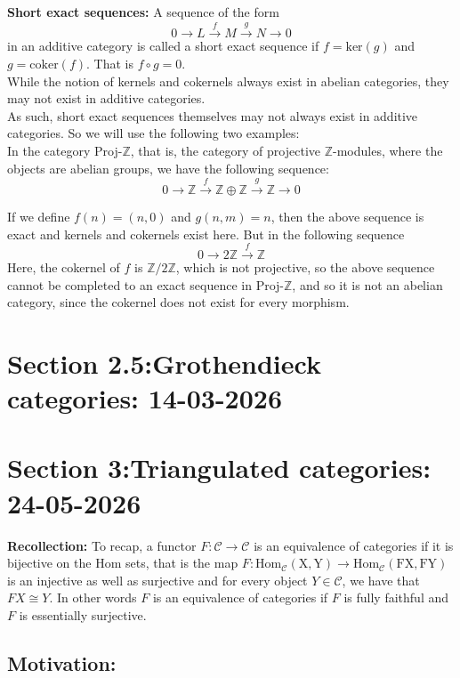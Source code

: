 \documentclass[12pt]{article}
\newcommand{\cat}[1]{\mathscr{#1}}
\begin{document}
\textbf{Short exact sequences: } A sequence of the form 
\[
 0 \xrightarrow{}L \xrightarrow{f}M \xrightarrow{g}N \xrightarrow{}0
\]
 in an additive category is called a short exact sequence if
 $f=\mathrm{ker}(g)$ and $g=\mathrm{coker}(f)$. That is $f \circ g=0$.\\

  While the notion of kernels and cokernels always exist in abelian categories, they may not exist in additive categories.\\
  As such, short exact sequences themselves may not always exist in additive categories. So we will use the following two examples:\\
  In the category Proj-$\mathbb{Z}$, that is, the category of projective $\mathbb{Z}$-modules, where the objects are abelian groups, we have the following sequence:
  \[
  0 \to \mathbb{Z} \xrightarrow{f} \mathbb{Z}\oplus \mathbb{Z} \xrightarrow{g}\mathbb{Z} \to 0
   \]

   If we define $f(n)=(n,0)$ and $g(n,m)=n$, then the above sequence is exact and kernels and cokernels exist here. But in the following sequence
   \[
   0 \to 2\mathbb{Z} \xrightarrow{f} \mathbb{Z} 
   \]
   Here, the cokernel of $f$ is $\mathbb{Z}/2\mathbb{Z}$, which is not projective, so the above sequence cannot be completed to an exact sequence in Proj-$\mathbb{Z}$, and so it is not an abelian category, since the cokernel does not exist for every morphism. 
\section*{Section 2.5:Grothendieck categories: 14-03-2026}
\section*{Section 3:Triangulated categories: 24-05-2026}
\textbf{Recollection: } To recap, a functor $F: \cat{C \to \cat{C}}$ is an equivalence of categories if it is bijective on the Hom sets, that is the map $F : \mathrm{Hom_\cat{C}(X,Y)} \to \mathrm{Hom_\cat{C}(FX,FY)}$ is an injective as well as surjective and for every object $Y \in \cat{C}$,  we have that $FX\cong Y$. In other words $F$ is an equivalence of categories if $F$ is fully faithful and $F$ is essentially surjective.

\subsection{Motivation: }
\end{document}
